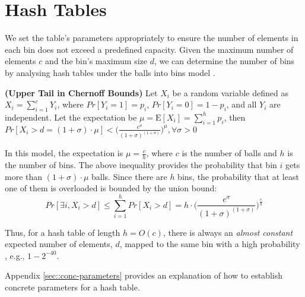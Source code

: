 
\section{Hash Tables}\label{Preliminary-Hash-Table}

We set the table's parameters appropriately to ensure the number of elements in each bin does not exceed a predefined capacity. Given the maximum number of elements $c$ and the bin's maximum size $d$, we can determine the number of bins by analysing hash tables under the balls into bins model  \cite{DBLP:conf/stoc/BerenbrinkCSV00}.
\vspace{-1mm}
\begin{theorem}\label{chernoff}\textbf{(Upper Tail in Chernoff Bounds)} Let $X_{\scriptscriptstyle i}$ be a random variable defined as $X_{\scriptscriptstyle i}=\sum\limits^{\scriptscriptstyle c}_{\scriptscriptstyle  i=1} Y_{\scriptscriptstyle i}$, where $Pr[Y_{\scriptscriptstyle i}=1]=p_{\scriptscriptstyle i}$, $Pr[Y_{\scriptscriptstyle i}=0]=1-p_{\scriptscriptstyle i}$, and all $Y_{\scriptscriptstyle i}$ are independent. Let the expectation be $\mu=\mathrm{E}[X_{\scriptscriptstyle i}]=\sum\limits ^{\scriptscriptstyle h}_{\scriptscriptstyle  i=1} p_{\scriptscriptstyle i}$, then 
$Pr[X_{\scriptscriptstyle i}>d=(1+\sigma)\cdot \mu]<\Big(\frac{e^{\scriptscriptstyle \sigma}}{(1+\sigma)^{\scriptscriptstyle (1+\sigma)}}\Big)^{\scriptscriptstyle \mu}, \forall \sigma>0$
\end{theorem}

In this model, the expectation is  $\mu=\frac{c}{h}$, where $c$ is the number of  balls and $h$ is the number of bins. The above inequality provides the probability that bin $i$ gets more than $(1+\sigma)\cdot \mu$ balls. Since there are $h$ bins, the probability that at least one of them is overloaded is bounded by the union bound:
\begin{equation}\label{equation:the-bound}
Pr[\exists i, X_{\scriptscriptstyle i}>d]\leq \sum\limits^{\scriptscriptstyle h}_{\scriptscriptstyle i=1}Pr[X_{\scriptscriptstyle i}>d] = h\cdot  \Big(\frac{e^{\scriptscriptstyle \sigma}}{(1+\sigma)^{\scriptscriptstyle (1+\sigma)}}\Big)^{\scriptscriptstyle \frac{c}{h}}
\end{equation}

Thus, for a hash table of length $h=O(c)$, there is always an  \emph{almost constant} expected number of elements, $d$,  mapped to the same bin  with a high probability \cite{DBLP:conf/ccs/PapamanthouTT08}, e.g., $1-2^{\scriptscriptstyle -40}$.


Appendix \ref{sec::conc-parameters} provides an explanation of how to establish concrete parameters for a hash table.
